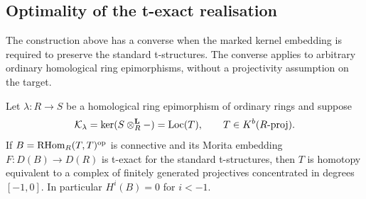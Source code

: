 \subsection{Optimality of the t-exact realisation}

The construction above has a converse when the marked kernel embedding is required to preserve the standard t-structures.  The converse applies to arbitrary ordinary homological ring epimorphisms, without a projectivity assumption on the target.

\begin{theorem}\label{thm:texact-optimality}
Let \(\lambda:R\to S\) be a homological ring epimorphism of ordinary rings and suppose
\[
 \mathcal K_\lambda=\ker(S\otimes^{\mathbf L}_R-)=\operatorname{Loc}(T),
 \qquad T\in K^b(R\text{-}\mathrm{proj}).
\]
If \(B=\operatorname{RHom}_R(T,T)^{\mathrm{op}}\) is connective and its Morita embedding
\(F:D(B)\to D(R)\) is t-exact for the standard t-structures, then \(T\) is homotopy equivalent to a complex of finitely generated projectives concentrated in degrees \([-1,0]\).  In particular \(H^i(B)=0\) for \(i<-1\).
\end{theorem}

